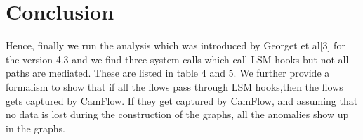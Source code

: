 \section{Conclusion}
Hence, finally we run the analysis which was introduced by Georget et al[3] for the version 4.3 and we find three system calls which call LSM hooks but not all paths are mediated. These are listed in table 4 and 5.
\vskip 0.2in
We further provide a formalism to show that if all the flows pass through LSM hooks,then the flows gets captured by CamFlow. If they get captured by CamFlow, and assuming that no data is lost during the construction of the graphs, all the anomalies show up in the graphs.